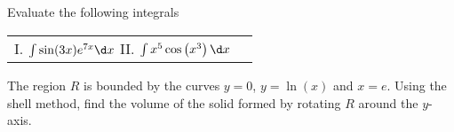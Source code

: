 \documentclass[handout]{ximera}
\begin{document}
\pagebreak

\begin{problem}

Evaluate the following integrals

\begin{center}
\begin{tabular}{ll}
I. $\int \sin(3x) e^{7x} \d x$ \hspace{.5in} II. $\int x^5 \cos \left( x^3 \right) \d x$
\end{tabular}
\end{center}
	
\end{problem}


\begin{problem}
The region $R$ is bounded by the curves $y=0$, $y=\ln (x)$ and $x=e$. Using the shell method, find the volume of the solid formed by rotating $R$ around the $y$-axis.
\end{problem}
\end{document}
